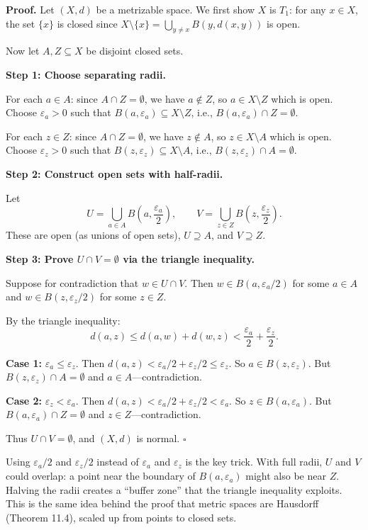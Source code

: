 \documentclass[11pt]{report}
\renewenvironment{proof}[1][Proof]{\noindent\textbf{#1.} }{\hfill$\square$\par\vspace{5pt}}
\begin{document}
\begin{proof}
Let $(X, d)$ be a metrizable space. We first show $X$ is $T_1$: for any $x \in X$, the set $\{x\}$ is closed since $X \setminus \{x\} = \bigcup_{y \neq x} B(y, d(x,y))$ is open.

Now let $A, Z \subseteq X$ be disjoint closed sets.

\textbf{Step 1: Choose separating radii.}

For each $a \in A$: since $A \cap Z = \emptyset$, we have $a \notin Z$, so $a \in X \setminus Z$ which is open. Choose $\varepsilon_a > 0$ such that $B(a, \varepsilon_a) \subseteq X \setminus Z$, i.e., $B(a, \varepsilon_a) \cap Z = \emptyset$.

For each $z \in Z$: since $A \cap Z = \emptyset$, we have $z \notin A$, so $z \in X \setminus A$ which is open. Choose $\varepsilon_z > 0$ such that $B(z, \varepsilon_z) \subseteq X \setminus A$, i.e., $B(z, \varepsilon_z) \cap A = \emptyset$.

\textbf{Step 2: Construct open sets with half-radii.}

Let
\[
U = \bigcup_{a \in A} B\!\left(a, \frac{\varepsilon_a}{2}\right), \qquad V = \bigcup_{z \in Z} B\!\left(z, \frac{\varepsilon_z}{2}\right).
\]
These are open (as unions of open sets), $U \supseteq A$, and $V \supseteq Z$.

\textbf{Step 3: Prove $U \cap V = \emptyset$ via the triangle inequality.}

Suppose for contradiction that $w \in U \cap V$. Then $w \in B(a, \varepsilon_a/2)$ for some $a \in A$ and $w \in B(z, \varepsilon_z/2)$ for some $z \in Z$.

By the triangle inequality:
\[
d(a, z) \leq d(a, w) + d(w, z) < \frac{\varepsilon_a}{2} + \frac{\varepsilon_z}{2}.
\]

\textbf{Case 1:} $\varepsilon_a \leq \varepsilon_z$. Then $d(a, z) < \varepsilon_a/2 + \varepsilon_z/2 \leq \varepsilon_z$. So $a \in B(z, \varepsilon_z)$. But $B(z, \varepsilon_z) \cap A = \emptyset$ and $a \in A$---contradiction.

\textbf{Case 2:} $\varepsilon_z < \varepsilon_a$. Then $d(a, z) < \varepsilon_a/2 + \varepsilon_z/2 < \varepsilon_a$. So $z \in B(a, \varepsilon_a)$. But $B(a, \varepsilon_a) \cap Z = \emptyset$ and $z \in Z$---contradiction.

Thus $U \cap V = \emptyset$, and $(X, d)$ is normal.
\end{proof}

\begin{rembox}
Using $\varepsilon_a/2$ and $\varepsilon_z/2$ instead of $\varepsilon_a$ and $\varepsilon_z$ is the key trick. With full radii, $U$ and $V$ could overlap: a point near the boundary of $B(a, \varepsilon_a)$ might also be near $Z$. Halving the radii creates a ``buffer zone'' that the triangle inequality exploits. This is the same idea behind the proof that metric spaces are Hausdorff (Theorem 11.4), scaled up from points to closed sets.
\end{rembox}
\end{document}

